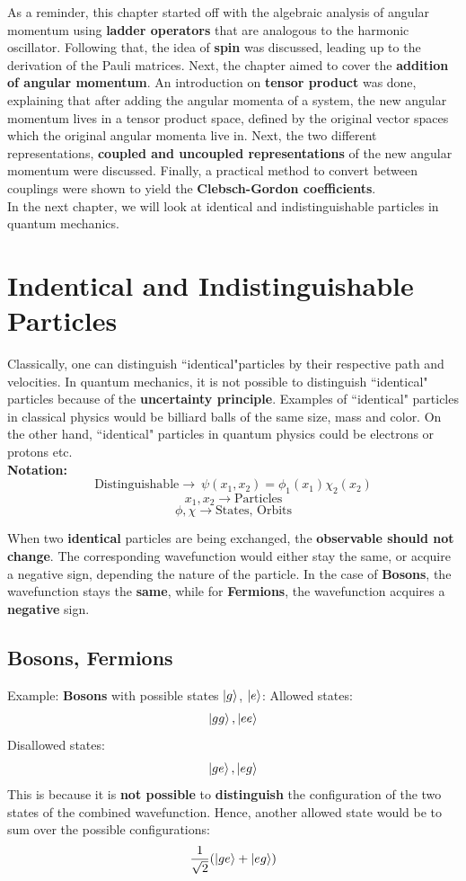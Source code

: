\documentclass{article}
\begin{document}
\begin{flushleft}
As a reminder, this chapter started off with the algebraic analysis of angular momentum using \textbf{ladder operators} that are analogous to the harmonic oscillator. Following that, the idea of \textbf{spin} was discussed, leading up to the derivation of the Pauli matrices. Next, the chapter aimed to cover the \textbf{addition of angular momentum}. An introduction on \textbf{tensor product} was done, explaining that after adding the angular momenta of a system, the new angular momentum lives in a tensor product space, defined by the original vector spaces which the original angular momenta live in. Next, the two different representations, \textbf{coupled and uncoupled representations} of the new angular momentum were discussed. Finally, a practical method to convert between couplings were shown to yield the \textbf{Clebsch-Gordon coefficients}.\\[.5cm]

In the next chapter, we will look at identical and indistinguishable particles in quantum mechanics.
\pagebreak

\section{Indentical and Indistinguishable Particles}

Classically, one can distinguish ``identical"particles by their respective path and velocities. In quantum mechanics, it is not possible to distinguish ``identical" particles because of the \textbf{uncertainty principle}. Examples of ``identical" particles in classical physics would be billiard balls of the same size, mass and color. On the other hand, ``identical" particles in quantum physics could be electrons or protons etc.\\
\textbf{Notation:}
$$\text{Distinguishable}\rightarrow\ \psi(x_1,x_2)=\phi_1(x_1)\chi_2(x_2)$$
$$x_1,x_2\rightarrow \text{Particles}$$
$$\phi,\chi\rightarrow \text{States, Orbits}$$

When two \textbf{identical} particles are being exchanged, the \textbf{observable should not change}. The corresponding wavefunction would either stay the same, or acquire a negative sign, depending the nature of the particle. In the case of \textbf{Bosons}, the wavefunction stays the \textbf{same}, while for \textbf{Fermions}, the wavefunction acquires a\textbf{ negative} sign.\\[.5cm]
\subsection{Bosons, Fermions}
Example: \textbf{Bosons} with possible states $\ket{g}$, $\ket{e}$:
Allowed states:
$$\ket{gg}, \ket{ee}$$
Disallowed states:
$$\ket{ge},\ket{eg}$$
This is because it is \textbf{not possible} to \textbf{distinguish} the configuration of the two states of the combined wavefunction. Hence, another allowed state would be to sum over the possible configurations:
$$\frac{1}{\sqrt{2}}(\ket{ge}+\ket{eg})$$



\end{flushleft}
\end{document}
